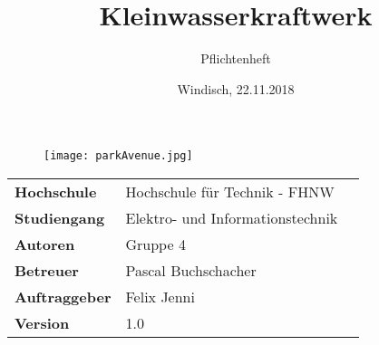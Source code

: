 \documentclass[final]{fhnwreport}       %
\title{Kleinwasserkraftwerk}          	%
\author{Pflichtenheft}          		%
\date{Windisch, 22.11.2018}             %
\begin{document}
\maketitle

\vspace*{-1cm}						    %
\vfill
\begin{figure} [H]
	\centering
	\texttt{[image: parkAvenue.jpg]}
	\label{fig:Park_Avenue_432}
\end{figure}
\vfill

{
\renewcommand\arraystretch{2}
\begin{center}
\begin{tabular}{ >{\bf} l p{10cm} l }
Hochschule&Hochschule für Technik - FHNW\\
Studiengang&Elektro- und Informationstechnik\\
Autoren&Gruppe 4\\%
Betreuer&Pascal Buchschacher\\
Auftraggeber&Felix Jenni\\
Version&1.0 %
\end{tabular}
\end{center}
}

\clearpage

\thispagestyle{empty}
			
\tableofcontents
\clearpage








\end{document}
